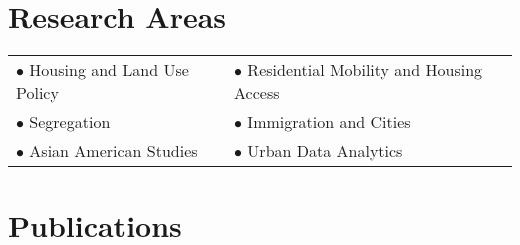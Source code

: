 \documentclass[12pt,letterpaper]{report}
\begin{document}
\section*{Research Areas}
\begin{tabular}{@{}p{} p{}@{}}
  $\bullet$ Housing and Land Use Policy & $\bullet$ Residential Mobility and Housing Access\\
  $\bullet$ Segregation & $\bullet$ Immigration and Cities\\
  $\bullet$ Asian American Studies & $\bullet$ Urban Data Analytics 
\end{tabular}
    
  
    \section*{Publications}
\end{document}
